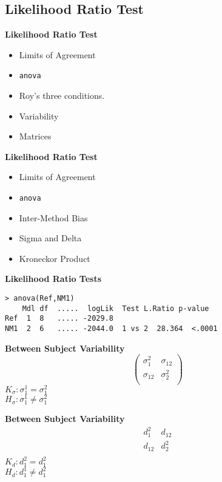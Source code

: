 \documentclass[compress]{beamer}        %
\makeatletter
\newcommand{\tcb}{\textcolor{beamer@blendedblue}}
\makeatother
\begin{document}
\subsection{Likelihood Ratio Test}
\begin{frame}{\bf \tcb{Likelihood Ratio Test}}
\begin{itemize}\itemsep0.7cm
\item Limits of Agreement
\item \texttt{anova}
\item Roy's three conditions.
\item Variability
\item Matrices
\end{itemize}
\end{frame}
\begin{frame}{\bf \tcb{Likelihood Ratio Test}}
\begin{itemize}\itemsep0.7cm
\item Limits of Agreement
\item \texttt{anova}
\item Inter-Method Bias
\item Sigma and Delta
\item Kroneckor Product
\end{itemize}
\end{frame}
\begin{frame}[fragile]{\bf \tcb{Likelihood Ratio Tests}}
\begin{verbatim}
> anova(Ref,NM1)
    Mdl df  .....  logLik  Test L.Ratio p-value
Ref  1  8   ..... -2029.8
NM1  2  6   ..... -2044.0  1 vs 2  28.364  <.0001
\end{verbatim}
\end{frame}


\begin{frame}{\bf \tcb{Between Subject Variability}}
\[\left(
\begin{array}{cc}
\sigma^2_1 & \sigma_{12}\\
\sigma_{12} & \sigma^2_2\\
\end{array}\right)
\]
$K_{\sigma}: \sigma^1_1 = \sigma^2_1$\\
$H_{\sigma}: \sigma^1_1 \neq \sigma^2_1$
\end{frame}

\begin{frame}{\bf \tcb{Between Subject Variability}}
\[
\begin{array}{cc}
d^2_1 & d_{12}\\
d_{12} & d^2_2\\
\end{array}
\]
$K_{d}: d^2_1 = d^2_1$\\
$H_{d}: d^1_1 \neq d^2_1$
\end{frame}
\end{document}
